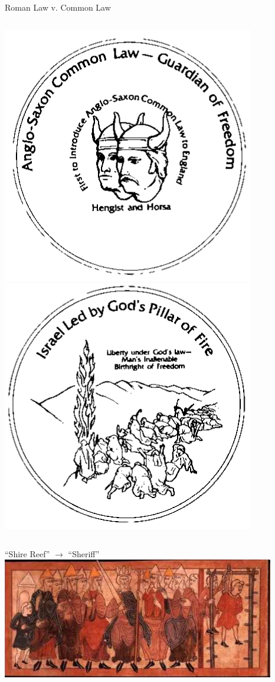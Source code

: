 \begin{frame}{Roman Law v. Common Law}
\begin{columns}[onlytextwidth]
            \centering
            \includegraphics[height=0.35\textheight]{img/hh-coin.png} \\
            \includegraphics[height=0.35\textheight]{img/israel-coin.png} \\
    \end{columns}
\end{frame}

\begin{frame}{``Shire Reef'' $\rightarrow$ ``Sheriff''}
    \centering
    \includegraphics[width=.9\textwidth]{img/shire-reef.png} \\
\end{frame}

